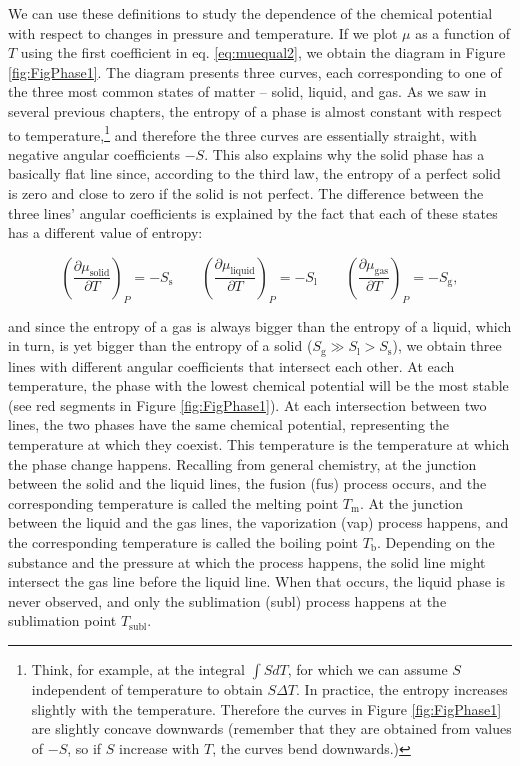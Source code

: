 \documentclass[
  9pt,
]{extbook}
\theoremstyle{definition}
\theoremstyle{definition}
\theoremstyle{definition}
\theoremstyle{remark}
\begin{document}
We can use these definitions to study the dependence of the chemical potential with respect to changes in pressure and temperature. If we plot \(\mu\) as a function of \(T\) using the first coefficient in eq. \eqref{eq:muequal2}, we obtain the diagram in Figure \ref{fig:FigPhase1}. The diagram presents three curves, each corresponding to one of the three most common states of matter -- solid, liquid, and gas. As we saw in several previous chapters, the entropy of a phase is almost constant with respect to temperature,\footnote{Think, for example, at the integral \(\int SdT\), for which we can assume \(S\) independent of temperature to obtain \(S\Delta T\). In practice, the entropy increases slightly with the temperature. Therefore the curves in Figure \ref{fig:FigPhase1} are slightly concave downwards (remember that they are obtained from values of \(-S\), so if \(S\) increase with \(T\), the curves bend downwards.)} and therefore the three curves are essentially straight, with negative angular coefficients \(-S\). This also explains why the solid phase has a basically flat line since, according to the third law, the entropy of a perfect solid is zero and close to zero if the solid is not perfect. The difference between the three lines' angular coefficients is explained by the fact that each of these states has a different value of entropy:

\begin{equation}
\left( \frac{\partial \mu_{\text{solid}}}{\partial T} \right)_P =-S_{\text{s}} \qquad \left( \frac{\partial \mu_{\text{liquid}}}{\partial T} \right)_P =-S_{\text{l}} \qquad \left( \frac{\partial \mu_{\text{gas}}}{\partial T} \right)_P =-S_{\text{g}},
\label{eq:muequal2}
\end{equation}

and since the entropy of a gas is always bigger than the entropy of a liquid, which in turn, is yet bigger than the entropy of a solid (\(S_{\text{g}} \gg S_{\text{l}}>S_{\text{s}}\)), we obtain three lines with different angular coefficients that intersect each other. At each temperature, the phase with the lowest chemical potential will be the most stable (see red segments in Figure \ref{fig:FigPhase1}). At each intersection between two lines, the two phases have the same chemical potential, representing the temperature at which they coexist. This temperature is the temperature at which the phase change happens. Recalling from general chemistry, at the junction between the solid and the liquid lines, the fusion (fus) process occurs, and the corresponding temperature is called the melting point \(T_{\text{m}}\). At the junction between the liquid and the gas lines, the vaporization (vap) process happens, and the corresponding temperature is called the boiling point \(T_{\text{b}}\). Depending on the substance and the pressure at which the process happens, the solid line might intersect the gas line before the liquid line. When that occurs, the liquid phase is never observed, and only the sublimation (subl) process happens at the sublimation point \(T_{\text{subl}}\).
\end{document}
